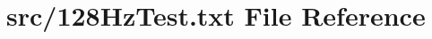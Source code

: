 \hypertarget{128HzTest_8txt}{}\section{src/128\+Hz\+Test.txt File Reference}
\label{128HzTest_8txt}
